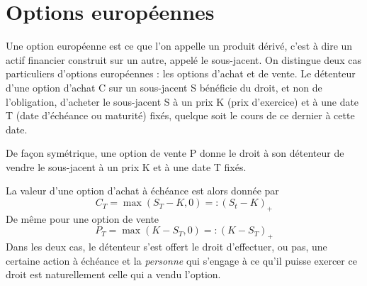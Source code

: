 \documentclass[a4paper]{book}
\begin{document}
\section{Options européennes}
Une option européenne est ce que l'on appelle un produit dérivé, c'est à dire un actif financier construit sur un autre, appelé le sous-jacent. On distingue deux cas particuliers d'options européennes : les options d'achat et de vente. Le détenteur d'une option d'achat C sur un sous-jacent S bénéficie du droit, et non de l'obligation, d'acheter le sous-jacent S à un prix K (prix d'exercice) et à une date T (date d'échéance ou maturité) fixés, quelque soit le cours de ce dernier à cette date.

De façon symétrique, une option de vente P donne le droit à son détenteur de vendre le sous-jacent à un prix K et à une date T fixés.

La valeur d'une option d'achat à échéance est alors donnée par
\begin{equation}
    C_T=\max(S_T-K,0)=:(S_t-K)_+
\end{equation}
De même pour une option de vente
\begin{equation}
    P_T=\max(K-S_T,0)=:(K-S_T)_+
\end{equation}
Dans les deux cas, le détenteur s'est offert le droit d'effectuer, ou pas, une certaine action à échéance et la \emph{personne} qui s'engage à ce qu'il puisse exercer ce droit est naturellement celle qui a vendu l'option.
\end{document}
